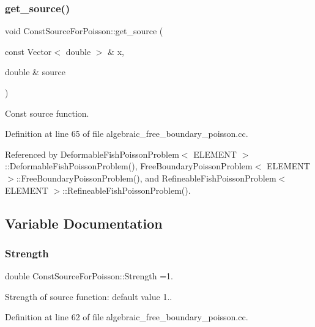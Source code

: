 \subsubsection{\texorpdfstring{get\+\_\+source()}{get\_source()}}
{\footnotesize\ttfamily void Const\+Source\+For\+Poisson\+::get\+\_\+source (\begin{DoxyParamCaption}\item[{const Vector$<$ double $>$ \&}]{x,  }\item[{double \&}]{source }\end{DoxyParamCaption})}



Const source function. 



Definition at line 65 of file algebraic\+\_\+free\+\_\+boundary\+\_\+poisson.\+cc.



Referenced by Deformable\+Fish\+Poisson\+Problem$<$ E\+L\+E\+M\+E\+N\+T $>$\+::\+Deformable\+Fish\+Poisson\+Problem(), Free\+Boundary\+Poisson\+Problem$<$ E\+L\+E\+M\+E\+N\+T $>$\+::\+Free\+Boundary\+Poisson\+Problem(), and Refineable\+Fish\+Poisson\+Problem$<$ E\+L\+E\+M\+E\+N\+T $>$\+::\+Refineable\+Fish\+Poisson\+Problem().



\subsection{Variable Documentation}
\mbox{\label{namespaceConstSourceForPoisson_add351c5acab2561d68d1fc9ec3d5fc5e}} 
\subsubsection{\texorpdfstring{Strength}{Strength}}
{\footnotesize\ttfamily double Const\+Source\+For\+Poisson\+::\+Strength =1.}



Strength of source function\+: default value 1.. 



Definition at line 62 of file algebraic\+\_\+free\+\_\+boundary\+\_\+poisson.\+cc.

